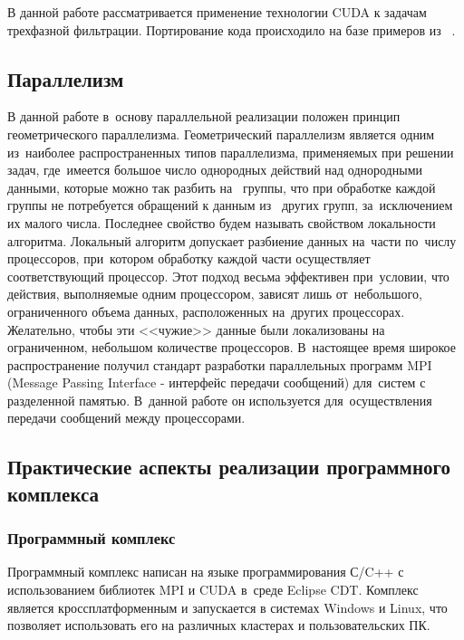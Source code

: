 В данной работе рассматривается применение технологии CUDA к задачам 
трехфазной фильтрации. Портирование кода происходило на базе
примеров из ~\cite{Sanders-CUDA}.

\subsection{Параллелизм}

В данной работе в~основу параллельной реализации положен принцип геометрического параллелизма.
Геометрический параллелизм является одним из~наиболее распространенных типов
параллелизма, применяемых при решении задач, где~имеется большое число
однородных действий над однородными данными, которые можно так разбить на~
группы, что при обработке каждой группы не потребуется обращений к данным из~
других групп, за~исключением их малого числа.
Последнее свойство будем называть свойством локальности алгоритма. Локальный
алгоритм допускает разбиение данных на~части по~числу процессоров, при~котором
обработку каждой части осуществляет соответствующий процессор. Этот подход
весьма эффективен при~условии, что действия, выполняемые одним процессором,
зависят лишь от~небольшого, ограниченного объема данных, расположенных на~других
процессорах. Желательно, чтобы эти <<чужие>> данные были локализованы на~
ограниченном, небольшом количестве процессоров.
В~настоящее время широкое распространение получил стандарт разработки
параллельных программ MPI (Message Passing Interface - интерфейс передачи
сообщений) для~систем с разделенной памятью. 
В~данной работе он используется для~осуществления передачи
сообщений между процессорами.

\subsection{Практические аспекты реализации программного комплекса}

\subsubsection{Программный комплекс}
Программный комплекс написан на языке
программирования С/C++ с использованием
библиотек MPI и CUDA в~среде Eclipse CDT. Комплекс является
кроссплатформенным и запускается в системах Windows и Linux, что
позволяет использовать его на различных кластерах и пользовательских ПК.

